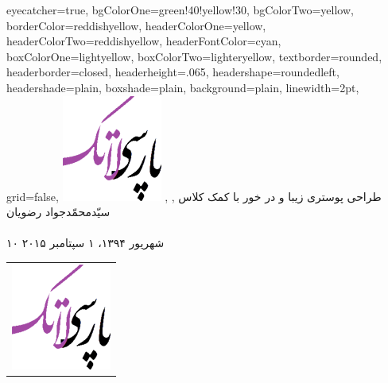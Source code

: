 \documentclass[debug,a0paper,persian]{xebaposter}
\begin{document}
      \begin{poster}%
      {
      eyecatcher=true,
      bgColorOne=green!40!yellow!30,%
      bgColorTwo=yellow,
      borderColor=reddishyellow,
      headerColorOne=yellow,
      headerColorTwo=reddishyellow,
      headerFontColor=cyan,
      boxColorOne=lightyellow,      
      boxColorTwo=lighteryellow,
      textborder=rounded,
      headerborder=closed,
      headerheight=.065\textheight,
      headershape=roundedleft,
      headershade=plain,
      boxshade=plain,
      background=plain,%
      linewidth=2pt,
      grid=false, %
      }
 {
      \includegraphics[height=0.07\textheight]{logo}
 }
 {طراحی پوستری زیبا و در خور با کمک کلاس 
}
 {\large {}, , سیّدمحمّدجواد رضویان
 \\%
 {\normalsize\texttt{}
 \\
۱۰ شهریور ۱۳۹۴، ۱ سپتامبر ۲۰۱۵
 }}
 {
\begin{tabular}{r}
    \includegraphics[height=0.07 \textheight]{logo}\\
\end{tabular}
 }


\end{poster}
\end{document}
